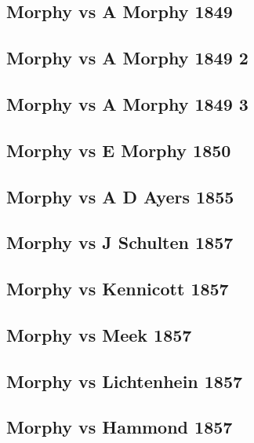 \documentclass[]{book}
\begin{document}
\subsection{Morphy vs A Morphy 1849}\label{morphy-vs-a-morphy-1849}

\subsection{Morphy vs A Morphy 1849 2}\label{morphy-vs-a-morphy-1849-2}

\subsection{Morphy vs A Morphy 1849 3}\label{morphy-vs-a-morphy-1849-3}

\subsection{Morphy vs E Morphy 1850}\label{morphy-vs-e-morphy-1850}

\subsection{Morphy vs A D Ayers 1855}\label{morphy-vs-a-d-ayers-1855}

\subsection{Morphy vs J Schulten 1857}\label{morphy-vs-j-schulten-1857}

\subsection{Morphy vs Kennicott 1857}\label{morphy-vs-kennicott-1857}

\subsection{Morphy vs Meek 1857}\label{morphy-vs-meek-1857}

\subsection{Morphy vs Lichtenhein
1857}\label{morphy-vs-lichtenhein-1857}

\subsection{Morphy vs Hammond 1857}\label{morphy-vs-hammond-1857}
\end{document}
